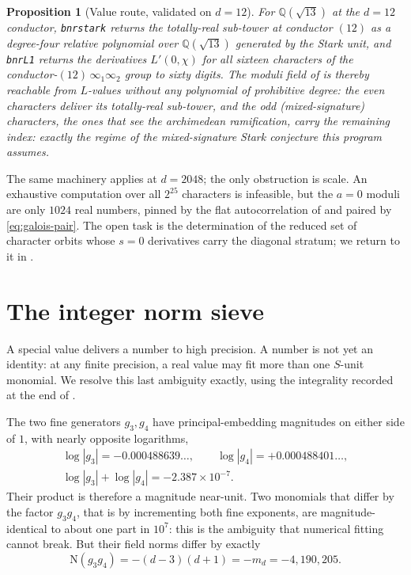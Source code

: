 \documentclass[12pt,a4paper]{article}
\newtheorem{proposition}[theorem]{Proposition}
\newcommand{\md}{m_d}
\newcommand{\Norm}{\mathrm{N}}
\begin{document}
\begin{proposition}[Value route, validated on $d=12$]
\label{prop:portals-d12}
For $\mathbb{Q}(\sqrt{13})$ at the $d=12$ conductor, \texttt{bnrstark} returns
the totally-real sub-tower at conductor $(12)$ as a degree-four relative
polynomial over $\mathbb{Q}(\sqrt{13})$ generated by the Stark unit, and
\texttt{bnrL1} returns the derivatives $L'(0,\chi)$ for all sixteen characters
of the conductor-$(12)\,\infty_1\infty_2$ group to sixty digits.  The moduli
field of  is thereby reachable from $L$-values without any
polynomial of prohibitive degree: the even characters deliver its totally-real
sub-tower, and the odd (mixed-signature) characters, the ones that see the
archimedean ramification, carry the remaining index: exactly the regime of
the mixed-signature Stark conjecture this program assumes.
\end{proposition}

The same machinery applies at $d=2048$; the only obstruction is scale.  An
exhaustive computation over all $2^{25}$ characters is infeasible, but the $a=0$
moduli are only $1024$ real numbers, pinned by the flat autocorrelation of
 and paired by \eqref{eq:galois-pair}.  The open task is the
determination of the reduced set of character orbits whose $s=0$ derivatives
carry the diagonal stratum; we return to it in .

\section{The integer norm sieve}
\label{sec:sieve}

A special value delivers a number to high precision.  A number is not yet an
identity: at any finite precision, a real value may fit more than one $S$-unit
monomial.  We resolve this last ambiguity exactly, using the integrality
recorded at the end of .

The two fine generators $g_3,g_4$ have principal-embedding magnitudes on either
side of $1$, with nearly opposite logarithms,
\[
\begin{gathered}
\log|g_3| = -0.000488639\ldots,\qquad
\log|g_4| = +0.000488401\ldots,\\
\log|g_3|+\log|g_4| = -2.387\times 10^{-7}.
\end{gathered}
\]
Their product is therefore a magnitude near-unit.  Two monomials that differ by
the factor $g_3 g_4$, that is by incrementing both fine exponents, are
magnitude-identical to about one part in $10^{7}$: this is the ambiguity that
numerical fitting cannot break.  But their field norms differ by exactly
\[
\Norm(g_3 g_4) = -(d-3)(d+1) = -\md = -4{,}190{,}205 .
\]
\end{document}
